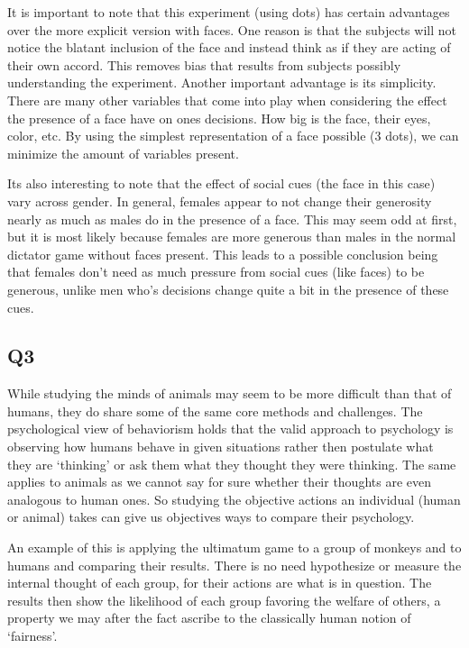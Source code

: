 \documentclass{article}
\begin{document}
It is important to note that this experiment (using dots) has certain advantages over the more explicit version with faces. One reason is that the subjects will not notice the blatant inclusion of the face and instead think as if they are acting of their own accord. This removes bias that results from subjects possibly understanding the experiment. Another important advantage is its simplicity. There are many other variables that come into play when considering the effect the presence of a face have on ones decisions. How big is the face, their eyes, color, etc. By using the simplest representation of a face possible (3 dots), we can minimize the amount of variables present.

Its also interesting to note that the effect of social cues (the face in this case) vary across gender. In general, females appear to not change their generosity nearly as much as males do in the presence of a face. This may seem odd at first, but it is most likely because females are more generous than males in the normal dictator game without faces present. This leads to a possible conclusion being that females don't need as much pressure from social cues (like faces) to be generous, unlike men who's decisions change quite a bit in the presence of these cues.

\subsection*{Q3}
While studying the minds of animals may seem to be more difficult than that of humans, they do share some of the same core methods and challenges. The psychological view of behaviorism holds that the valid approach to psychology is observing how humans behave in given situations rather then postulate what they are `thinking' or ask them what they thought they were thinking. The same applies to animals as we cannot say for sure whether their thoughts are even analogous to human ones. So studying the objective actions an individual (human or animal) takes can give us objectives ways to compare their psychology.

An example of this is applying the ultimatum game to a group of monkeys and to humans and comparing their results. There is no need hypothesize or measure the internal thought of each group, for their actions are what is in question. The results then show the likelihood of each group favoring the welfare of others, a property we may after the fact ascribe to the classically human notion of `fairness'.
\end{document}
